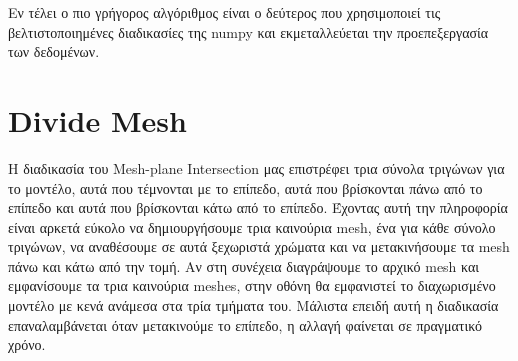 \documentclass{article}
\begin{document}
Εν τέλει ο πιο γρήγορος αλγόριθμος είναι ο δεύτερος που χρησιμοποιεί τις
βελτιστοποιημένες διαδικασίες της numpy και εκμεταλλεύεται την προεπεξεργασία των
δεδομένων.

\section{Divide Mesh}
Η διαδικασία του Mesh-plane Intersection μας επιστρέφει τρια σύνολα τριγώνων για το
μοντέλο, αυτά που τέμνονται με το επίπεδο, αυτά που βρίσκονται πάνω από το επίπεδο και
αυτά που βρίσκονται κάτω από το επίπεδο. Έχοντας αυτή την πληροφορία είναι αρκετά εύκολο
να δημιουργήσουμε τρια καινούρια mesh, ένα για κάθε σύνολο τριγώνων, να αναθέσουμε σε
αυτά ξεχωριστά χρώματα και να μετακινήσουμε τα mesh πάνω και κάτω από την τομή.
Αν στη συνέχεια διαγράψουμε το αρχικό mesh και εμφανίσουμε τα τρια καινούρια meshes, στην
οθόνη θα εμφανιστεί το διαχωρισμένο μοντέλο με κενά ανάμεσα στα τρία τμήματα του. Μάλιστα
επειδή αυτή η διαδικασία επαναλαμβάνεται όταν μετακινούμε το επίπεδο, η αλλαγή φαίνεται
σε πραγματικό χρόνο.
\end{document}
